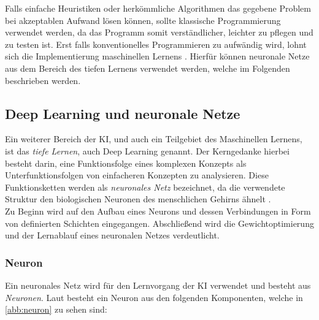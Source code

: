 \documentclass[12pt,a4paper,bibliography=totocnumbered,listof=totocnumbered]{article}
\begin{document}
Falls einfache Heuristiken oder herkömmliche Algorithmen das gegebene Problem bei akzeptablen Aufwand lösen können, sollte klassische Programmierung verwendet werden, da das Programm somit verständlicher, leichter zu pflegen und zu testen ist. Erst falls konventionelles Programmieren zu aufwändig wird, lohnt sich die Implementierung maschinellen Lernens \citep[Kapitel 1.1.2]{Ferguson.2019}. Hierfür können neuronale Netze aus dem Bereich des tiefen Lernens verwendet werden, welche im Folgenden beschrieben werden.

\subsection{Deep Learning und neuronale Netze} \label{sec:dp_nn}
Ein weiterer Bereich der KI, und auch ein Teilgebiet des Maschinellen Lernens, ist das \emph{tiefe Lernen}, auch Deep Learning genannt. Der Kerngedanke hierbei besteht darin, eine Funktionsfolge eines komplexen Konzepts als Unterfunktionsfolgen von einfacheren Konzepten zu analysieren. Diese Funktionsketten werden als \textit{neuronales Netz} bezeichnet, da die verwendete Struktur den biologischen Neuronen des menschlichen Gehirns ähnelt \citep[Kapitel 1.3]{Ferguson.2019}.\\Zu Beginn wird auf den Aufbau eines Neurons und dessen Verbindungen in Form von definierten Schichten eingegangen. Abschließend wird die Gewichtoptimierung und der Lernablauf eines neuronalen Netzes verdeutlicht.

\subsubsection{Neuron}
Ein neuronales Netz wird für den Lernvorgang der KI verwendet und besteht aus \emph{Neuronen}. Laut \citep[S. 192]{UweLammel.2020} besteht ein Neuron aus den folgenden Komponenten, welche in \autoref{abb:neuron} zu sehen sind:
\end{document}

